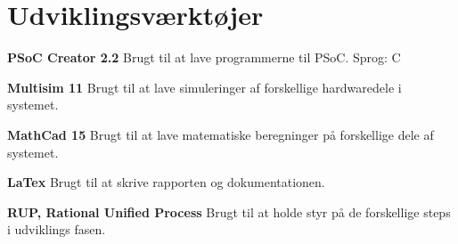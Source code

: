 \newpage
\section{Udviklingsværktøjer}
\label{chap:udviklingsvaerktoejer}

\textbf{PSoC Creator 2.2}\newline
Brugt til at lave programmerne til PSoC.\newline
Sprog: C

\textbf{Multisim 11}\newline
Brugt til at lave simuleringer af forskellige hardwaredele i systemet.

\textbf{MathCad 15}\newline
Brugt til at lave matematiske beregninger på forskellige dele af systemet.

\textbf{LaTex}\newline
Brugt til at skrive rapporten og dokumentationen.

\textbf{RUP, Rational Unified Process}\newline
Brugt til at holde styr på de forskellige steps i udviklings fasen.

